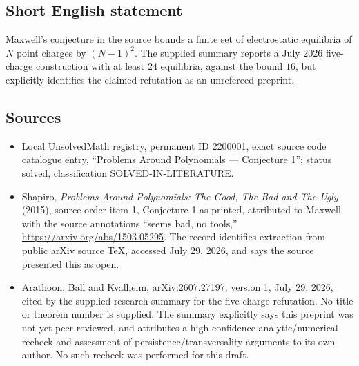 \documentclass[11pt]{article}
\begin{document}
\subsection{Short English statement}
Maxwell's conjecture in the source bounds a finite set of electrostatic equilibria of $N$ point charges by $(N-1)^2$. The supplied summary reports a July 2026 five-charge construction with at least $24$ equilibria, against the bound $16$, but explicitly identifies the claimed refutation as an unrefereed preprint.
\subsection{Sources}
\begin{itemize}
\item Local UnsolvedMath registry, permanent ID 2200001, exact source code catalogue entry, ``Problems Around Polynomials --- Conjecture 1''; status solved, classification SOLVED-IN-LITERATURE.
\item Shapiro, \emph{Problems Around Polynomials: The Good, The Bad and The Ugly} (2015), source-order item 1, Conjecture 1 as printed, attributed to Maxwell with the source annotations ``seems bad, no tools,'' \url{https://arxiv.org/abs/1503.05295}. The record identifies extraction from public arXiv source TeX, accessed July 29, 2026, and says the source presented this as open.
\item Arathoon, Ball and Kvalheim, arXiv:2607.27197, version 1, July 29, 2026, cited by the supplied research summary for the five-charge refutation. No title or theorem number is supplied. The summary explicitly says this preprint was not yet peer-reviewed, and attributes a high-confidence analytic/numerical recheck and assessment of persistence/transversality arguments to its own author. No such recheck was performed for this draft.
\end{itemize}
\end{document}
